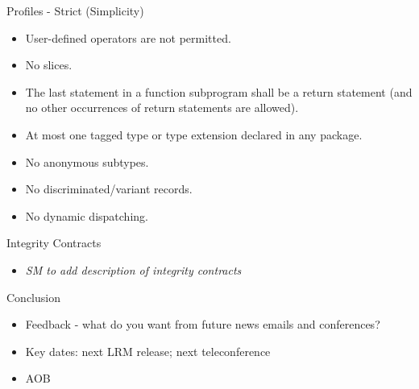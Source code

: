 \documentclass{beamer}
\begin{document}
\begin{frame}{Profiles - Strict (Simplicity)}

  \begin{itemize}

  \item User-defined operators are not permitted.

  \item No slices.

  \item The last statement in a function subprogram shall be a return statement
        (and no other occurrences of return statements are allowed).

  \item At most one tagged type or type extension declared in any package.

  \item No anonymous subtypes.

  \item No discriminated/variant records.

  \item No dynamic dispatching.

  \end{itemize}

\end{frame}

\begin{frame}{Integrity Contracts}

  \begin{itemize}

  \item \emph{SM to add description of integrity contracts}

  \end{itemize}

\end{frame}

\begin{frame}{Conclusion}

  \begin{itemize}

  \item Feedback - what do you want from future news emails and conferences?
  \item Key dates: next LRM release; next teleconference
  \item AOB

  \end{itemize}

\end{frame}
\end{document}
